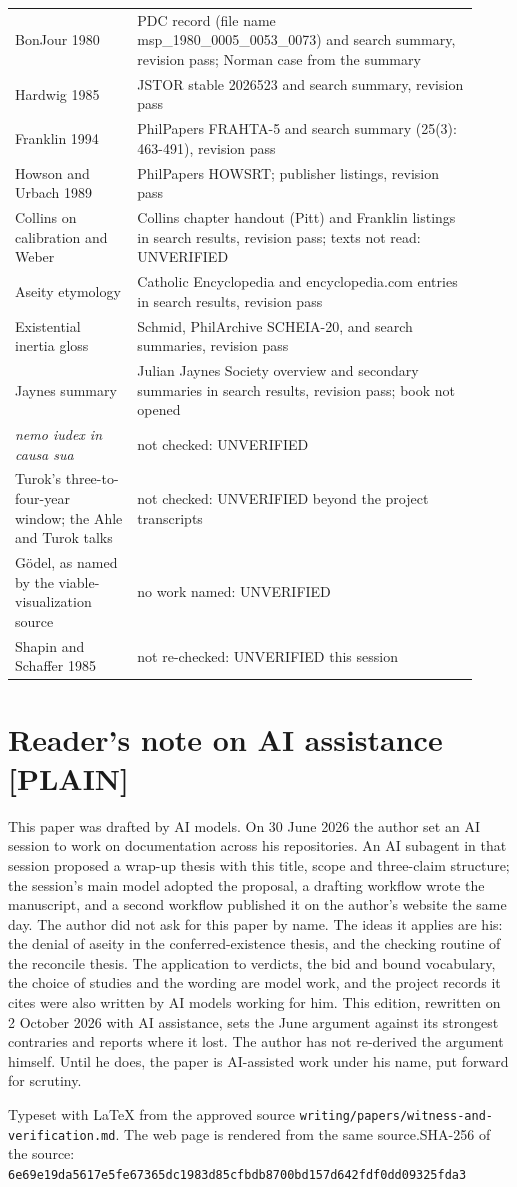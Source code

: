 \documentclass[11pt]{article}
\newcommand{\register}[1]{{\ttfamily\small #1}}
\begin{document}
{\begin{longtable}{>{\raggedright\arraybackslash}p{0.242\linewidth}>{\raggedright\arraybackslash}p{0.678\linewidth}}
BonJour 1980 & PDC record (file name msp\_1980\_0005\_0053\_0073) and search summary, revision pass; Norman case from the summary \\
Hardwig 1985 & JSTOR stable 2026523 and search summary, revision pass \\
Franklin 1994 & PhilPapers FRAHTA-5 and search summary (25(3): 463-491), revision pass \\
Howson and Urbach 1989 & PhilPapers HOWSRT; publisher listings, revision pass \\
Collins on calibration and Weber & Collins chapter handout (Pitt) and Franklin listings in search results, revision pass; texts not read: UNVERIFIED \\
Aseity etymology & Catholic Encyclopedia and encyclopedia.com entries in search results, revision pass \\
Existential inertia gloss & Schmid, PhilArchive SCHEIA-20, and search summaries, revision pass \\
Jaynes summary & Julian Jaynes Society overview and secondary summaries in search results, revision pass; book not opened \\
\emph{nemo iudex in causa sua} & not checked: UNVERIFIED \\
Turok's three-to-four-year window; the Ahle and Turok talks & not checked: UNVERIFIED beyond the project transcripts \\
Gödel, as named by the viable-visualization source & no work named: UNVERIFIED \\
Shapin and Schaffer 1985 & not re-checked: UNVERIFIED this session \\
\bottomrule\end{longtable}}
\section*{Reader's note on AI assistance \register{[PLAIN]}}

This paper was drafted by AI models. On 30 June 2026 the author set an AI session to work on documentation across his repositories. An AI subagent in that session proposed a wrap-up thesis with this title, scope and three-claim structure; the session's main model adopted the proposal, a drafting workflow wrote the manuscript, and a second workflow published it on the author's website the same day. The author did not ask for this paper by name. The ideas it applies are his: the denial of aseity in the conferred-existence thesis, and the checking routine of the reconcile thesis. The application to verdicts, the bid and bound vocabulary, the choice of studies and the wording are model work, and the project records it cites were also written by AI models working for him. This edition, rewritten on 2 October 2026 with AI assistance, sets the June argument against its strongest contraries and reports where it lost. The author has not re-derived the argument himself. Until he does, the paper is AI-assisted work under his name, put forward for scrutiny.

\vfill{\footnotesize Typeset with LaTeX from the approved source \texttt{writing/papers/witness-and-verification.md}. The web page is rendered from the same source.\newline SHA-256 of the source: \texttt{6e69e19da5617e5fe67365dc1983d85cfbdb8700bd157d642fdf0dd09325fda3}\par}
\end{document}

